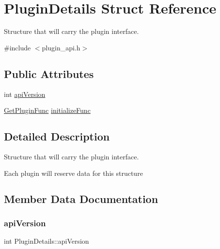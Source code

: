 \hypertarget{structPluginDetails}{}\section{Plugin\+Details Struct Reference}
\label{structPluginDetails}


Structure that will carry the plugin interface.  




{\ttfamily \#include $<$plugin\+\_\+api.\+h$>$}

\subsection*{Public Attributes}
\begin{DoxyCompactItemize}
\item 
int \hyperlink{structPluginDetails_a464b27b2e32725b45c27ce7f18756b01}{api\+Version}
\item 
\hyperlink{plugin__api_8h_ad9875bfebc4c7cc82c302b2a164de423}{Get\+Plugin\+Func} \hyperlink{structPluginDetails_a874533d2111b34f7c7f65d03c02cc0e2}{initialize\+Func}
\end{DoxyCompactItemize}


\subsection{Detailed Description}
Structure that will carry the plugin interface. 

Each plugin will reserve data for this structure 

\subsection{Member Data Documentation}
\mbox{\label{structPluginDetails_a464b27b2e32725b45c27ce7f18756b01}} 
\subsubsection{\texorpdfstring{api\+Version}{apiVersion}}
{\footnotesize\ttfamily int Plugin\+Details\+::api\+Version}

\mbox{\label{structPluginDetails_a874533d2111b34f7c7f65d03c02cc0e2}} 
